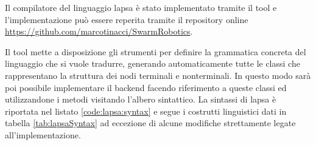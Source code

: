 \appendix
{}\label{app:implementazione}
Il compilatore del linguaggio \ac{lapsa} è stato implementato tramite il tool \xtext{} \cite{xtext} e l'implementazione può essere reperita tramite il repository online \url{https://github.com/marcotinacci/SwarmRobotics}.

Il tool mette a disposizione gli strumenti per definire la grammatica concreta del linguaggio che si vuole tradurre, generando automaticamente tutte le classi \java{} che rappresentano la struttura dei nodi terminali e nonterminali. In questo modo sarà poi possibile implementare il backend facendo riferimento a queste classi ed utilizzandone i metodi visitando l'albero sintattico. La sintassi di \ac{lapsa} è riportata nel listato \ref{code:lapsa:syntax} e segue i costrutti linguistici dati in tabella \ref{tab:lapsaSyntax} ad eccezione di alcune modifiche strettamente legate all'implementazione.

